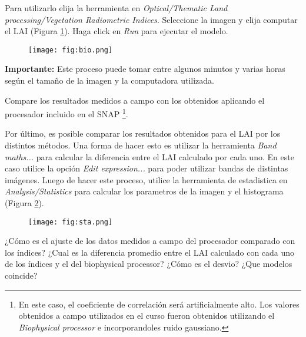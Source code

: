 Para utilizarlo elija la herramienta en \emph{Optical/Thematic Land processing/Vegetation Radiometric Indices}. Seleccione la imagen  y elija computar el LAI (Figura \ref{fig:bio}). Haga click en \emph{Run} para ejecutar el modelo.

\begin{figure}[h!]
    \centering
    \texttt{[image: fig:bio.png]}
    \caption{}
    \label{fig:bio}
\end{figure}

\textbf{Importante:} Este proceso puede tomar entre algunos minutos y varias horas según el tamaño de la imagen y la computadora utilizada.

Compare los resultados medidos a campo con los obtenidos aplicando el procesador incluido en el SNAP \footnote{En este caso, el coeficiente de correlación será artificialmente alto. Los valores obtenidos a campo utilizados en el curso fueron obtenidos utilizando el \emph{Biophysical processor} e incorporandoles ruido gaussiano.}.

Por último, es posible comparar los resultados obtenidos para el LAI por los distintos métodos. Una forma de hacer esto es utilizar la herramienta \emph{Band maths...} para calcular la diferencia entre el LAI calculado por cada uno. En este caso utilice la opción \emph{Edit expression...} para poder utilizar bandas de distintas imágenes. Luego de hacer este proceso, utilice la herramienta de estadistica en \emph{Analysis/Statistics} para calcular los parametros de la imagen y el histograma (Figura \ref{fig:sta}).

\begin{figure}[h!]
    \centering
    \texttt{[image: fig:sta.png]}
    \caption{}
    \label{fig:sta}
\end{figure}

\begin{que}
    ¿Cómo es el ajuste de los datos medidos a campo del procesador comparado con los índices? ¿Cual es la diferencia promedio entre el LAI calculado con cada uno de los índices y el del biophysical processor? ¿Cómo es el desvio? ¿Que modelos coincide?
\end{que}
